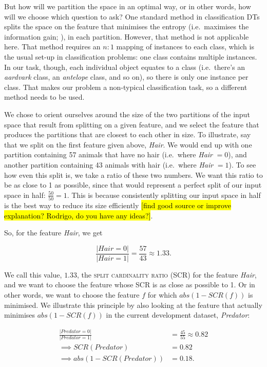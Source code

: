 \documentclass[a4paper,12pt]{article}
\begin{document}
But how will we partition the space in an optimal way, or in other words, how will we choose which question to ask?
One standard method in classification DTs splits the space on the feature that minimises the entropy (i.e.\ maximises the information gain; \citealt{Quinlan1986}), in each partition.
However, that method is not applicable here.
That method requires an $n : 1$ mapping of instances to each class, which is the usual set-up in classification problems: one class contains multiple instances.
In our task, though, each individual object equates to a class (i.e.\ there's an \textit{aardvark} class, an \textit{antelope} class, and so on), so there is only one instance per class.
That makes our problem a non-typical classification task, so a different method needs to be used.

We chose to orient ourselves around the size of the two partitions of the input space that result from splitting on a given feature, and we select the feature that produces the partitions that are closest to each other in size.
To illustrate, say that we split on the first feature given above, \textit{Hair}.
We would end up with one partition containing 57 animals that have no hair (i.e.\ where \textit{Hair} $= 0$), and another partition containing 43 animals with hair (i.e.\ where \textit{Hair} $= 1$).
To see how even this split is, we take a ratio of these two numbers.
We want this ratio to be as close to 1 as possible, since that would represent a perfect split of our input space in half: $\frac{50}{50} = 1$.
This is because consistently splitting our input space in half is the best way to reduce its size efficiently \hl{[find good source or improve explanation? Rodrigo, do you have any ideas?]}.

So, for the feature \textit{Hair}, we get

$$\frac{|Hair = 0|}{|Hair = 1|} = \frac{57}{43} \approx 1.33.$$

We call this value, $1.33$, the \textsc{split cardinality ratio} (SCR) for the feature \textit{Hair}, and we want to choose the feature whose SCR is as close as possible to 1.
Or in other words, we want to choose the feature $f$ for which $abs(1 - SCR(f))$ is minimised.
We illustrate this principle by also looking at the feature that actually minimises  $abs(1 - SCR(f))$ in the current development dataset, \textit{Predator}:

\begin{align*}
\frac{|Predator = 0|}{|Predator = 1|} &= \frac{45}{55} \approx 0.82 \\
\implies SCR(Predator) & = 0.82\\
\implies abs(1 - SCR(Predator)) &= 0.18.
\end{align*}
\end{document}
